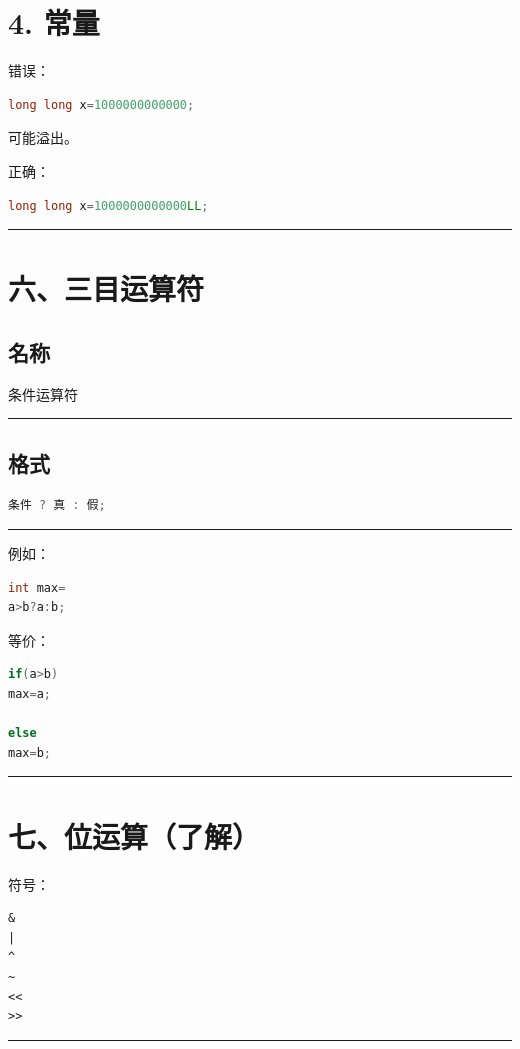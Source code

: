 \documentclass[10pt,twocolumn]{extarticle}
\begin{document}
\section{4. 常量}
错误：
\begin{lstlisting}[language=C++]
long long x=1000000000000;
\end{lstlisting}
可能溢出。

正确：
\begin{lstlisting}[language=C++]
long long x=1000000000000LL;
\end{lstlisting}

\noindent\rule{\linewidth}{0.4pt}

\section{六、三目运算符}

\subsection{名称}
条件运算符

\noindent\rule{\linewidth}{0.4pt}

\subsection{格式}
\begin{lstlisting}[language=C++]
条件 ? 真 : 假;
\end{lstlisting}

\noindent\rule{\linewidth}{0.4pt}

例如：
\begin{lstlisting}[language=C++]
int max=
a>b?a:b;
\end{lstlisting}
等价：
\begin{lstlisting}[language=C++]
if(a>b)
max=a;

else
max=b;
\end{lstlisting}

\noindent\rule{\linewidth}{0.4pt}

\section{七、位运算（了解）}

符号：
\begin{lstlisting}
&
|
^
~
<<
>>
\end{lstlisting}

\noindent\rule{\linewidth}{0.4pt}
\end{document}
